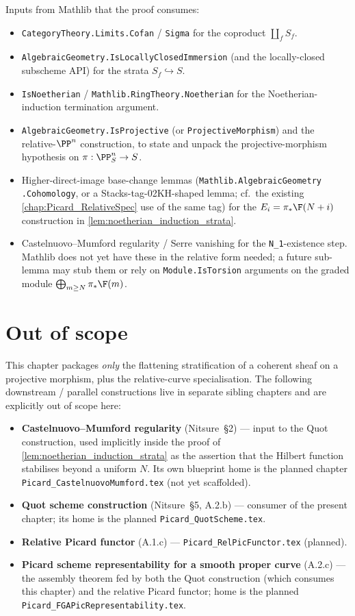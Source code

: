 Inputs from Mathlib that the proof consumes:
\begin{itemize}
  \item \texttt{CategoryTheory.Limits.Cofan} / \texttt{Sigma} for the coproduct
    \(\coprod_f S_f\).
  \item \texttt{AlgebraicGeometry.IsLocallyClosedImmersion} (and the locally-closed
    subscheme API) for the strata \(S_f \hookrightarrow S\).
  \item \texttt{IsNoetherian} / \texttt{Mathlib.RingTheory.Noetherian} for the
    Noetherian-induction termination argument.
  \item \texttt{AlgebraicGeometry.IsProjective} (or
    \texttt{ProjectiveMorphism}) and the relative-\(\PP^n\) construction, to
    state and unpack the projective-morphism hypothesis on
    \(\pi : \PP^n_S \to S\).
  \item Higher-direct-image base-change lemmas (\texttt{Mathlib.AlgebraicGeometry
    .Cohomology}, or a Stacks-tag-02KH-shaped lemma; cf.\ the existing
    \cref{chap:Picard_RelativeSpec} use of the same tag) for the \(E_i = \pi_*\F(N+i)\)
    construction in \cref{lem:noetherian_induction_strata}.
  \item Castelnuovo--Mumford regularity / Serre vanishing for the
    \texttt{N\_1}-existence step.  Mathlib does not yet have these in the
    relative form needed; a future sub-lemma may stub them or rely on
    \texttt{Module.IsTorsion} arguments on the graded module
    \(\bigoplus_{m \ge N} \pi_* \F(m)\).
\end{itemize}

\section{Out of scope}
\label{sec:flatstrat_out_of_scope}

This chapter packages \emph{only} the flattening stratification of a coherent
sheaf on a projective morphism, plus the relative-curve specialisation. The
following downstream / parallel constructions live in separate sibling
chapters and are explicitly out of scope here:
\begin{itemize}
  \item \textbf{Castelnuovo--Mumford regularity} (Nitsure~\S2) --- input to the
    Quot construction, used implicitly inside the proof of
    \cref{lem:noetherian_induction_strata} as the assertion that the
    Hilbert function stabilises beyond a uniform \(N\).  Its own blueprint home
    is the planned chapter \texttt{Picard\_CastelnuovoMumford.tex} (not yet
    scaffolded).
  \item \textbf{Quot scheme construction} (Nitsure~\S5, A.2.b) --- consumer of
    the present chapter; its home is the planned \texttt{Picard\_QuotScheme.tex}.
  \item \textbf{Relative Picard functor} (A.1.c) ---
    \texttt{Picard\_RelPicFunctor.tex} (planned).
  \item \textbf{Picard scheme representability for a smooth proper curve}
    (A.2.c) --- the assembly theorem fed by both the Quot construction (which
    consumes this chapter) and the relative Picard functor; home is the
    planned \texttt{Picard\_FGAPicRepresentability.tex}.
\end{itemize}
